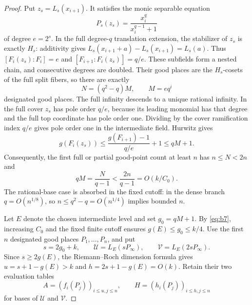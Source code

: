 \documentclass[11pt,letterpaper]{article}
\numberwithin{equation}{section}
\begin{document}
\begin{proof}
Put $z_s=L_s(x_{i+1})$.
It satisfies the monic separable equation
\begin{equation}
P_s(z_s)=\frac{x_i^q}{x_i^{q-1}+1}
\label{eq:b4}
\end{equation}
of degree $e=2^s$.
In the full degree-$q$ translation extension, the stabilizer of $z_s$ is exactly $H_s$: additivity gives $L_s(x_{i+1}+a)-L_s(x_{i+1})=L_s(a)$.
Thus $[F_i(z_s):F_i]=e$ and $[F_{i+1}:F_i(z_s)]=q/e$.
These subfields form a nested chain, and consecutive degrees are doubled.
Their good places are the $H_s$-cosets of the full split fibers, so there are exactly
\begin{equation}
N=(q^2-q)M,\qquad M=e q^i
\label{eq:b5}
\end{equation}
designated good places.
The full infinity descends to a unique rational infinity.
In the full cover $z_s$ has pole order $q/e$, because its leading monomial has that degree and the full top coordinate has pole order one.
Dividing by the cover ramification index $q/e$ gives pole order one in the intermediate field.
Hurwitz gives
\begin{equation}
g(F_i(z_s))\le\frac{g(F_{i+1})-1}{q/e}+1
 \le qM+1.
\label{eq:b6}
\end{equation}
Consequently, the first full or partial good-point count at least $n$ has $n\le N<2n$ and
\begin{equation}
qM=\frac{N}{q-1}<\frac{2n}{q-1}=O(k/C_0).
\label{eq:b7}
\end{equation}
The rational-base case is absorbed in the fixed cutoff: in the dense branch $q=O(n^{1/8})$, so $n\le q^2-q=O(n^{1/4})$ implies bounded $n$.

Let $E$ denote the chosen intermediate level and set $g_0=qM+1$.
By \eqref{eq:b7}, increasing $C_0$ and the fixed finite cutoff ensures $g(E)\le g_0\le k/4$.
Use the first $n$ designated good places $P_1,\ldots,P_n$, and put
\begin{equation}
s=2g_0+k,\qquad \mathcal U=L_E(sP_\infty),\qquad
 \mathcal V=L_E(2sP_\infty).                            \label{eq:b8}
\end{equation}
Since $s\ge2g(E)$, the Riemann--Roch dimension formula gives $u=s+1-g(E)>k$ and $h=2s+1-g(E)=O(k)$.
Retain their two evaluation tables
\begin{equation}
A=(f_i(P_j))_{i\le u,j\le n},\qquad
 H=(h_i(P_j))_{i\le h,j\le n}                           \label{eq:b9}
\end{equation}
for bases of $\mathcal U$ and $\mathcal V$.


\end{proof}
\end{document}
